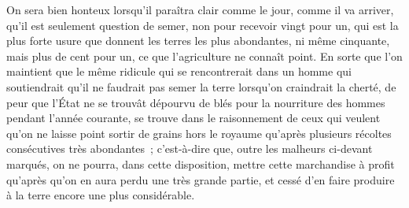 \documentclass[french,twoside]{book} %
\begin{document}
On sera bien honteux lorsqu’il paraîtra clair comme le jour, comme il va arriver, qu’il est seulement question de semer, non pour recevoir vingt pour un, qui est la plus forte usure que donnent les terres les plus abondantes, ni même cinquante, mais plus de cent pour un, ce que l’agriculture ne connaît point. En sorte que l’on maintient que le même ridicule qui se rencontrerait dans un homme qui soutiendrait qu’il ne faudrait pas semer la terre lorsqu’on craindrait la cherté, de peur que l’État ne se trouvât dépourvu de blés pour la nourriture des hommes pendant l’année courante, se trouve dans le raisonnement de ceux qui veulent qu’on ne laisse point sortir de grains hors le royaume qu’après plusieurs récoltes consécutives très abondantes ; c’est-à-dire que, outre les malheurs ci-devant marqués, on ne pourra, dans cette disposition, mettre cette marchandise à profit qu’après qu’on en aura perdu une très grande partie, et cessé d’en faire produire à la terre encore une plus considérable.
\end{document}
